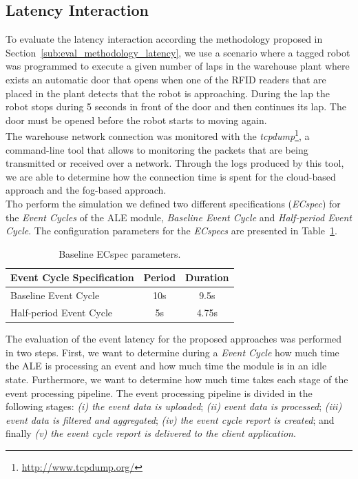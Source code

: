 \subsection{Latency Interaction}
\label{sub:eval_exp_latency}
To evaluate the latency interaction according the methodology proposed in Section~\ref{sub:eval_methodology_latency},
we use a scenario where a tagged robot was programmed to execute a given number of laps in the
warehouse plant where exists an automatic door that opens when one of the \gls{RFID} readers
that are placed in the plant detects that the robot is approaching. During the lap the robot stops during 5 seconds
in front of the door and then continues its lap. The door must be opened before the robot starts
to moving again.\\

The warehouse network connection was monitored with the \textit{tcpdump}\footnote{\url{http://www.tcpdump.org/}},
a command-line tool that allows to monitoring the packets that are being transmitted or received over
a network. Through the logs produced by this tool, we are able to determine how the connection time
is spent for the cloud-based approach and the fog-based approach.\\

Tho perform the simulation we defined two different specifications (\textit{ECspec}) for the
\textit{Event Cycles} of the \gls{ALE} module, \textit{Baseline Event Cycle} and
\textit{Half-period Event Cycle}. The configuration parameters for the \textit{ECspecs} are presented
in Table~\ref{table:ecspec_parameters}.

\begin{table}[ht!]
 \begin{tabular}{|l|c|c|}
  \hline
  Event Cycle Specification & Period  & Duration \\ \hline
  Baseline Event Cycle      &  10s    & 9.5s     \\ \hline
  Half-period Event Cycle   &   5s    & 4.75s    \\ \hline
 \end{tabular}
 \caption{Baseline ECspec parameters.}
 \label{table:ecspec_parameters}
\end{table}

The evaluation of the event latency for the proposed approaches was performed in two steps. First,
we want to determine during a \textit{Event Cycle} how much time the \gls{ALE} is processing an event
and how much time the module is in an idle state. Furthermore, we want to determine how much time
takes each stage of the event processing pipeline. The event processing pipeline is divided in the
following stages: \textit{(i) the event data is uploaded}; \textit{(ii) event data is processed};
\textit{(iii) event data is filtered and aggregated}; \textit{(iv) the event cycle report is created};
and finally \textit{(v) the event cycle report is delivered to the client application}.

